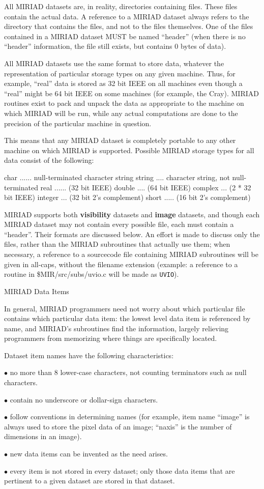 All MIRIAD datasets are, in reality, directories containing
files.  These files contain the actual data.  A reference to a
MIRIAD dataset always refers to the directory that contains
the files, and not to the files themselves.  One of the files
contained in a MIRIAD dataset MUST be named ``header''
(when there is no ``header'' information, the file still exists,
but contains 0 bytes of data).

All MIRIAD datasets use the same format to store data, whatever
the representation of particular storage types on any given machine.
Thus, for example, ``real'' data is stored as 32 bit IEEE on all
machines even though a ``real'' might be 64 bit IEEE on some machines
(for example, the Cray).  MIRIAD routines exist to pack and unpack
the data as appropriate to the machine on which MIRIAD will be
run, while any actual computations are done to the precision of the
particular machine in question.

This means that any MIRIAD dataset is completely portable to
any other machine on which MIRIAD is supported.  Possible MIRIAD
storage types for all data consist of the following:

{\ninepoint\begintt
char ...... null-terminated character string
string .... character string, not null-terminated
real ...... (32 bit IEEE)
double .... (64 bit IEEE)
complex ... (2 * 32 bit IEEE)
integer ... (32 bit 2's complement)
short ..... (16 bit 2's complement)
\endtt}

MIRIAD supports both {\bf visibility} datasets and {\bf image}
datasets, and though each MIRIAD dataset may not contain every
possible file, each must contain a ``header''.  Their formats are
discussed below.  An effort is made to discuss only the files, rather
than the MIRIAD subroutines that actually use them; when
necessary, a reference to a sourcecode file containing MIRIAD
subroutines will be given in all-caps, without the filename extension
(example:  a reference to a routine in \$MIR/src/subs/uvio.c will be
made as {\tt UVIO}).

\beginsection MIRIAD Data Items

In general, MIRIAD programmers need not worry about which
particular file contains which particular data item:  the lowest
level data item is referenced by name, and MIRIAD's subroutines
find the information, largely relieving programmers from memorizing
where things are specifically located.

Dataset item names have the following characteristics:
\item{$\bullet$} no more than 8 lower-case characters, not counting
terminators such as null characters.
\item{$\bullet$} contain no underscore or dollar-sign characters.
\item{$\bullet$} follow conventions in determining names (for example,
item name ``image'' is always used to store the pixel data of an image;
``naxis'' is the number of dimensions in an image).
\item{$\bullet$} new data items can be invented as the need arises.
\item{$\bullet$} every item is not stored in every dataset; only those
data items that are pertinent to a given dataset are stored in that
dataset.

